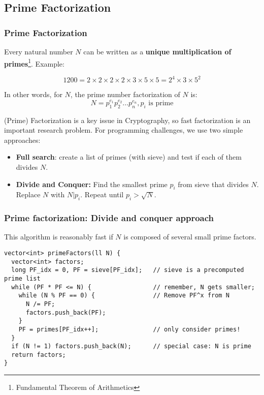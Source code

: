 \subsection{Prime Factorization}
\begin{frame}
  \frametitle{Prime Factorization}

  Every natural number $N$ can be written as a {\bf unique multiplication of primes}\footnote{Fundamental Theorem of Arithmetics}. Example:

  \begin{equation*}
    1200 = 2\times2\times2\times2\times3\times5\times5 = 2^4\times3\times5^2
  \end{equation*}

  In other words, for $N$, the prime number factorization of $N$ is:
    \begin{equation*}
      N=p_1^{e_1}p_2^{e_2}\ldots p_n^{e_n}, p_i \text{ is prime}
    \end{equation*}

  (Prime) Factorization is a key issue in Cryptography, so fast factorization is an important research problem. For programming challenges, we use two simple approaches:\bigskip

  \begin{itemize}
    \item {\bf Full search}: create a list of primes (with sieve) and test if each of them divides $N$.
    \item {\bf Divide and Conquer:} Find the smallest prime $p_i$ from sieve that divides $N$. Replace $N$ with $N|p_i$. Repeat until $p_i > \sqrt{N}$.
  \end{itemize}
\end{frame}

\begin{frame}[fragile]
  \frametitle{Prime factorization: Divide and conquer approach}

  This algorithm is reasonably fast if $N$ is composed of several small prime factors.

  {\smaller
  \begin{exampleblock}{}
\begin{verbatim}
vector<int> primeFactors(ll N) {
  vector<int> factors;
  long PF_idx = 0, PF = sieve[PF_idx];   // sieve is a precomputed prime list
  while (PF * PF <= N) {                 // remember, N gets smaller;
    while (N % PF == 0) {                // Remove PF^x from N
      N /= PF;
      factors.push_back(PF);
    }
    PF = primes[PF_idx++];               // only consider primes!
  }
  if (N != 1) factors.push_back(N);      // special case: N is prime
  return factors;
}
\end{verbatim}
  \end{exampleblock}}
\end{frame}

